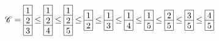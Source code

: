 \[
\SC = 
\begin{array}[c]{*{1}c}\cline{1-1}
\lr{1}\\\cline{1-1}
\lr{2}\\\cline{1-1}
\lr{3}\\\cline{1-1}
\end{array}
\le
\begin{array}[c]{*{1}c}\cline{1-1}
\lr{1}\\\cline{1-1}
\lr{2}\\\cline{1-1}
\lr{4}\\\cline{1-1}
\end{array}
\le
\begin{array}[c]{*{1}c}\cline{1-1}
\lr{1}\\\cline{1-1}
\lr{2}\\\cline{1-1}
\lr{5}\\\cline{1-1}
\end{array}
\le
\begin{array}[c]{*{1}c}\cline{1-1}
\lr{1}\\\cline{1-1}
\lr{2}\\\cline{1-1}
\end{array}
\le
\begin{array}[c]{*{1}c}\cline{1-1}
\lr{1}\\\cline{1-1}
\lr{3}\\\cline{1-1}
\end{array}
\le
\begin{array}[c]{*{1}c}\cline{1-1}
\lr{1}\\\cline{1-1}
\lr{4}\\\cline{1-1}
\end{array}
\le
\begin{array}[c]{*{1}c}\cline{1-1}
\lr{1}\\\cline{1-1}
\lr{5}\\\cline{1-1}
\end{array}
\le
\begin{array}[c]{*{1}c}\cline{1-1}
\lr{2}\\\cline{1-1}
\lr{5}\\\cline{1-1}
\end{array}
\le
\begin{array}[c]{*{1}c}\cline{1-1}
\lr{3}\\\cline{1-1}
\lr{5}\\\cline{1-1}
\end{array}
\le
\begin{array}[c]{*{1}c}\cline{1-1}
\lr{4}\\\cline{1-1}
\lr{5}\\\cline{1-1}
\end{array}
\]
